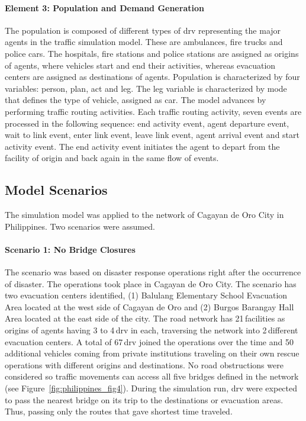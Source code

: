 \paragraph{Element 3: Population and Demand Generation}
The population is composed of different types of \gls{drv} representing the major agents in the traffic simulation model. These are ambulances, fire trucks and police cars.  The hospitals, fire stations and police stations are assigned as origins of agents, where vehicles start and end their activities, whereas evacuation centers are assigned as destinations of agents. Population is characterized by four variables: person, plan, act and leg. The leg variable is characterized by mode that defines the type of vehicle, assigned as car. The model advances by performing traffic routing activities. Each traffic routing activity, seven events are processed in the following sequence: end activity event, agent departure event, wait to link event, enter link event, leave link event, agent arrival event and start activity event. The end activity event initiates the agent to depart from the facility of origin and back again in the same flow of events. 

\subsection{Model Scenarios} 
The simulation model was applied to the network of Cagayan de Oro City in Philippines. Two scenarios were assumed.

\paragraph{Scenario 1: No Bridge Closures}
The scenario was based on disaster response operations right after the occurrence of disaster. The operations took place in Cagayan de Oro City. The scenario has two evacuation centers identified, (1) Balulang Elementary School Evacuation Area located at the west side of Cagayan de Oro and (2) Burgos Barangay Hall Area located at the east side of the city. The road network has 21\,facilities as origins of agents having 3 to 4\,\gls{drv} in each, traversing the network into 2\,different evacuation centers. A total of 67\,\gls{drv} joined the operations over the time and 50\,additional vehicles coming from private institutions traveling on their own rescue operations with different origins and destinations. No road obstructions were considered so traffic movements can access all five bridges defined in the network (see Figure~\ref{fig:philippines_fig4}). During the simulation run, \gls{drv} were expected to pass the nearest bridge on its trip to the destinations or evacuation areas. Thus, passing only the routes that gave shortest time traveled.

